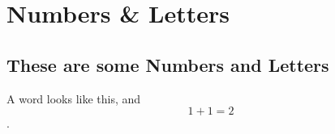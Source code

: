\chapter{Numbers \& Letters}
\label{app:endix}

\minitoc

\section{These are some Numbers and Letters}
\label{app:some numbers and some letters}

A word looks like this, and \[ 1 +1 = 2\] \cite{whitehead1927principia}.


